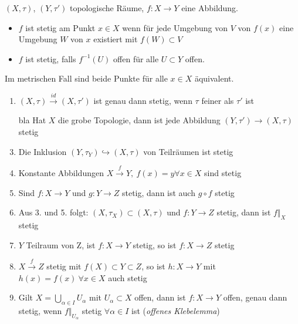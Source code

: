 \documentclass{skript}
\begin{document}
\begin{dfn}
    $(X,\tau)$, $(Y,\tau')$ topologische Räume, $f:X\to Y$ eine Abbildung.
    \begin{itemize}
        \item $f$ ist stetig am Punkt $x\in X$ wenn für jede Umgebung von $V$ von
            $f(x)$ eine Umgebung $W$ von $x$ existiert mit $f(W)\subset V$
        \item $f$ ist stetig, falls $f^{-1}(U)$ offen für alle $U\subset Y$ offen.
    \end{itemize}
    \begin{bem}
        Im metrischen Fall sind beide Punkte für alle $x\in X$ äquivalent.
    \end{bem}

    \begin{bsps}
        \begin{enumerate}
            \item $(X,\tau)\overset{id}{\to}(X,\tau')$ ist genau dann stetig, wenn
                $\tau$ feiner als $\tau'$ ist
            \item[bla] Hat $X$ die grobe Topologie, dann ist jede Abbildung
                $(Y,\tau')\to(X,\tau)$ stetig
            \item Die Inklusion $(Y,\tau_Y)\hookrightarrow (X,\tau)$ von Teilräumen
                ist stetig
            \item Konstante Abbildungen $X\overset{f}\to Y,\ f(x) = y \forall x\in X$
                sind stetig
            \item Sind $f:X\to Y$ und $g: Y\to Z$ stetig, dann ist auch $g\circ f$
                stetig
            \item Aus 3. und 5. folgt: $(X,\tau_X)\subset(X,\tau)$ und $f:Y\to Z$
                stetig, dann ist $f\Vert_X$ stetig
            \item $Y$ Teilraum von Z, ist $f:X\to Y$ stetig, so ist $f:X\to Z$ stetig
            \item $X\overset{f}\to Z$ stetig mit $f(X)\subset Y\subset Z$, so ist
                $h:X\to Y$ mit $h(x) = f(x)\ \forall x\in X$ auch stetig
            \item Gilt $X = \bigcup_{\alpha\in I}U_\alpha$ mit $U_\alpha\subset X$
                offen, dann ist $f:X\to Y$ offen, genau dann stetig, wenn
                $f\Vert_{U_\alpha}$ stetig $\forall\alpha\in I$ ist (\emph{offenes
                Klebelemma})
        \end{enumerate}
    \end{bsps}
\end{dfn}
\end{document}
